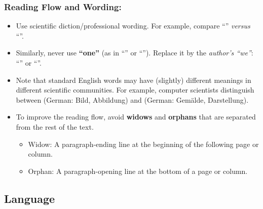 \documentclass[11pt,a4paper]{article}
\begin{document}
\subsubsection*{Reading Flow and Wording:}
\begin{itemize}
  
  \item Use scientific diction/professional wording. For example, compare ``'' \emph{versus} ``''.

  \item Similarly, never use \textbf{``one''} (as in ``'' or ``''). Replace it by the \emph{author's ``we''}: ``'' or ``''.
  
  \item Note that standard English words may have (slightly) different meanings in different scientific communities.
  For example, computer scientists distinguish between  (German: Bild, Abbildung) and  (German: Gem\"alde, Darstellung).
  

\item To improve the reading flow, avoid \textbf{widows} and \textbf{orphans} that are separated
from the rest of the text.

    \begin{itemize}
    \item Widow: A paragraph-ending line at the beginning of the following page or column.
    \item Orphan: A paragraph-opening line at the bottom of a page or column.
    \end{itemize}

\end{itemize}


\subsection{Language}
\label{sec-spec:lang}
\end{document}
